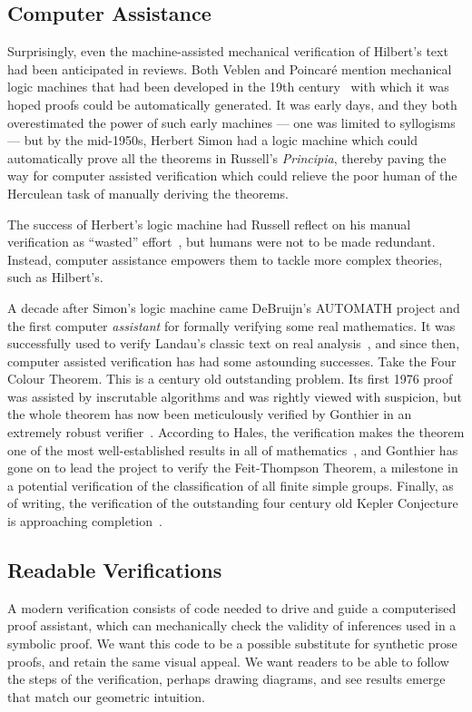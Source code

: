 \subsection{Computer Assistance}
Surprisingly, even the machine-assisted mechanical verification of Hilbert's text had been anticipated in reviews. Both Veblen and Poincar\'{e} mention mechanical logic machines that had been developed in the 19th century~\cite{LogicMachines} with which it was hoped proofs could be automatically generated. It was early days, and they both overestimated the power of such early machines --- one was limited to syllogisms --- but by the mid-1950s, Herbert Simon had a logic machine which could automatically prove all the theorems in Russell's \emph{Principia}, thereby paving the way for computer assisted verification which could relieve the poor human of the Herculean task of manually deriving the theorems. 

The success of Herbert's logic machine had Russell reflect on his manual verification as ``wasted'' effort~\cite{SimonObituary}, but humans were not to be made redundant. Instead, computer assistance empowers them to tackle more complex theories, such as Hilbert's.

A decade after Simon's logic machine came DeBruijn's AUTOMATH project and the first computer \emph{assistant} for formally verifying some real mathematics. It was successfully used to verify Landau's classic text on real analysis~\cite{LandauGrundlagen,LandauAUTOMATH}, and since then, computer assisted verification has had some astounding successes. Take the Four Colour Theorem. This is a century old outstanding problem. Its first 1976 proof was assisted by inscrutable algorithms and was rightly viewed with suspicion, but the whole theorem has now been meticulously verified by Gonthier in an extremely robust verifier~\cite{GonthierFCT}. According to Hales, the verification makes the theorem one of the most well-established results in all of mathematics~\cite{HalesFormalProof}, and Gonthier has gone on to lead the project to verify the Feit-Thompson Theorem, a milestone in a potential verification of the classification of all finite simple groups. Finally, as of writing, the verification of the outstanding four century old Kepler Conjecture is approaching completion~\cite{flyspeck}. 

\subsection{Readable Verifications}
A modern verification consists of code needed to drive and guide a computerised proof assistant, which can mechanically check the validity of inferences used in a symbolic proof. We want this code to be a possible substitute for synthetic prose proofs, and retain the same visual appeal. We want readers to be able to follow the steps of the verification, perhaps drawing diagrams, and see results emerge that match our geometric intuition.


